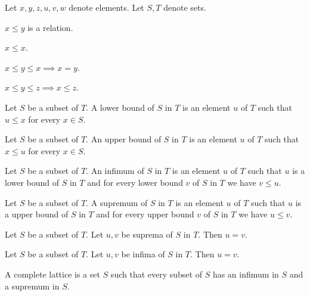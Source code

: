 \documentclass[english]{article}
\begin{document}
  \begin{forthel}
    Let $x,y,z,u,v,w$ denote elements. Let $S,T$ denote sets.

    \begin{signature}
      $x \leq y$ is a relation.
    \end{signature}

    \begin{axiom}
      $x \leq x$.
    \end{axiom}

    \begin{axiom}
      $x \leq y \leq x \implies x = y$.
    \end{axiom}

    \begin{axiom}
      $x \leq y \leq z \implies x \leq z$.
    \end{axiom}

    \begin{definition}
      Let $S$ be a subset of $T$.
      A lower bound of $S$ in $T$ is an element $u$ of $T$ such that $u \leq x$
      for every $x \in S$.
    \end{definition}

    \begin{definition}
      Let $S$ be a subset of $T$.
      An upper bound of $S$ in $T$ is an element $u$ of $T$ such that $x \leq u$
      for every $x \in S$.
    \end{definition}

    \begin{definition}
      Let $S$ be a subset of $T$.
      An infimum of $S$ in $T$ is an element $u$ of $T$ such that $u$ is a lower
      bound of $S$ in $T$ and for every lower bound $v$ of $S$ in $T$ we have
      $v \leq u$.
    \end{definition}

    \begin{definition}
      Let $S$ be a subset of $T$.
      A supremum of $S$ in $T$ is an element $u$ of $T$ such that $u$ is a upper
      bound of $S$ in $T$ and for every upper bound $v$ of $S$ in $T$ we have
      $u \leq v$.
    \end{definition}

    \begin{lemma}
      Let $S$ be a subset of $T$. Let $u,v$ be suprema of $S$ in $T$.
      Then $u = v$.
    \end{lemma}

    \begin{lemma}
      Let $S$ be a subset of $T$. Let $u,v$ be infima of $S$ in $T$.
      Then $u = v$.
    \end{lemma}

    \begin{definition}
      A complete lattice is a set $S$ such that every subset of $S$ has an
      infimum in $S$ and a supremum in $S$.
    \end{definition}
  \end{forthel}
\end{document}

